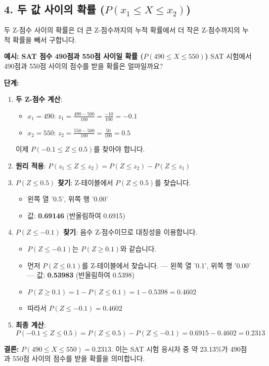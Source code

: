 \documentclass[11pt,a4paper]{book}
\theoremstyle{definition}
\begin{document}
\subsection{4. 두 값 사이의 확률 ($P(x_1 \le X \le x_2)$)}
두 Z-점수 사이의 확률은 더 큰 Z-점수까지의 누적 확률에서 더 작은 Z-점수까지의 누적 확률을 빼서 구합니다.

\begin{examplebox}
\textbf{예시: SAT 점수 490점과 550점 사이일 확률 ($P(490 \le X \le 550)$)}
SAT 시험에서 490점과 550점 사이의 점수를 받을 확률은 얼마일까요?

\textbf{단계:}
\begin{enumerate}
    \item \textbf{두 Z-점수 계산}:
    \begin{itemize}
        \item $x_1 = 490$: $z_1 = \frac{490 - 500}{100} = \frac{-10}{100} = -0.1$
        \item $x_2 = 550$: $z_2 = \frac{550 - 500}{100} = \frac{50}{100} = 0.5$
    \end{itemize}
    이제 $P(-0.1 \le Z \le 0.5)$를 찾아야 합니다.
    \item \textbf{원리 적용}: $P(z_1 \le Z \le z_2) = P(Z \le z_2) - P(Z \le z_1)$
    \item \textbf{$P(Z \le 0.5)$ 찾기}: Z-테이블에서 $P(Z \le 0.5)$를 찾습니다.
    \begin{itemize}
        \item 왼쪽 열 '0.5', 위쪽 행 '0.00'
        \item 값: \textbf{0.69146} (반올림하여 0.6915)
    \end{itemize}
    \item \textbf{$P(Z \le -0.1)$ 찾기}: 음수 Z-점수이므로 대칭성을 이용합니다.
    \begin{itemize}
        \item $P(Z \le -0.1)$는 $P(Z \ge 0.1)$와 같습니다.
        \item 먼저 $P(Z \le 0.1)$를 Z-테이블에서 찾습니다.
                --- 왼쪽 열 '0.1', 위쪽 행 '0.00'
                --- 값: \textbf{0.53983} (반올림하여 0.5398)
        \item $P(Z \ge 0.1) = 1 - P(Z \le 0.1) = 1 - 0.5398 = 0.4602$
        \item 따라서 $P(Z \le -0.1) = 0.4602$
    \end{itemize}
    \item \textbf{최종 계산}:
    \[ P(-0.1 \le Z \le 0.5) = P(Z \le 0.5) - P(Z \le -0.1) = 0.6915 - 0.4602 = 0.2313 \]
\end{enumerate}
\textbf{결론:} $P(490 \le X \le 550) = 0.2313$. 이는 SAT 시험 응시자 중 약 23.13\%가 490점과 550점 사이의 점수를 받을 확률을 의미합니다.


\end{examplebox}
\end{document}
